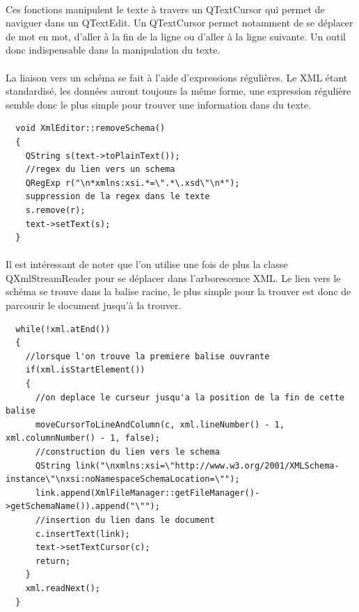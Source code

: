 \paragraph{}
Ces fonctions manipulent le texte à travers un QTextCursor qui permet de naviguer dans un QTextEdit. Un QTextCursor permet notamment de se déplacer de mot en mot, d'aller à la fin de la ligne ou d'aller à la ligne suivante. Un outil donc indispensable dans la manipulation du texte.

\paragraph{}
La liaison vers un schéma se fait à l'aide d'expressions régulières. Le XML étant standardisé, les données auront toujours la même forme, une expression régulière semble donc le plus simple pour trouver une information dans du texte.

\begin{lstlisting}
  void XmlEditor::removeSchema()
  {
    QString s(text->toPlainText());
    //regex du lien vers un schema
    QRegExp r("\n*xmlns:xsi.*=\".*\.xsd\"\n*");
    suppression de la regex dans le texte
    s.remove(r);
    text->setText(s);
  }
\end{lstlisting}
\paragraph{}
Il est intéressant de noter que l'on utilise une fois de plus la classe QXmlStreamReader pour se déplacer dans l'arborescence XML. Le lien vers le schéma se trouve dans la balise racine, le plus simple pour la trouver est donc de parcourir le document jusqu'à la trouver.
\begin{lstlisting}
  while(!xml.atEnd())
  {
    //lorsque l'on trouve la premiere balise ouvrante
    if(xml.isStartElement())
    {
      //on deplace le curseur jusqu'a la position de la fin de cette balise
      moveCursorToLineAndColumn(c, xml.lineNumber() - 1, xml.columnNumber() - 1, false);
      //construction du lien vers le schema
      QString link("\nxmlns:xsi=\"http://www.w3.org/2001/XMLSchema-instance\"\nxsi:noNamespaceSchemaLocation=\"");
      link.append(XmlFileManager::getFileManager()->getSchemaName()).append("\"");
      //insertion du lien dans le document
      c.insertText(link);
      text->setTextCursor(c);
      return;
    }
    xml.readNext();
  }
\end{lstlisting}
